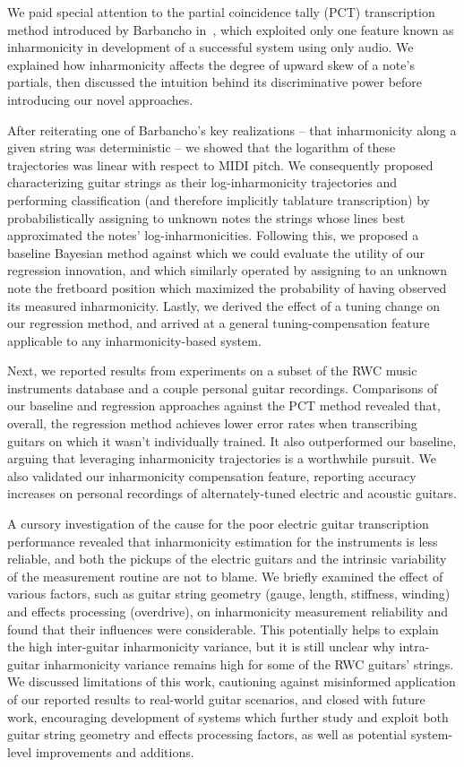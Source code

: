 \documentclass[12pt]{cmuthesis}
\begin{document}
We paid special attention to the partial coincidence tally (PCT) transcription method introduced by Barbancho in~\cite{barbanchoi2012}, which exploited only one feature known as inharmonicity in development of a successful system using only audio. We explained how inharmonicity affects the degree of upward skew of a note's partials, then discussed the intuition behind its discriminative power before introducing our novel approaches.

After reiterating one of Barbancho's key realizations -- that inharmonicity along a given string was deterministic -- we showed that the logarithm of these trajectories was linear with respect to MIDI pitch. We consequently proposed characterizing guitar strings as their log-inharmonicity trajectories and performing classification (and therefore implicitly tablature transcription) by probabilistically assigning to unknown notes the strings whose lines best approximated the notes' log-inharmonicities. Following this, we proposed a baseline Bayesian method against which we could evaluate the utility of our regression innovation, and which similarly operated by assigning to an unknown note the fretboard position which maximized the probability of having observed its measured inharmonicity. Lastly, we derived the effect of a tuning change on our regression method, and arrived at a general tuning-compensation feature applicable to any inharmonicity-based system.

Next, we reported results from experiments on a subset of the RWC music instruments database and a couple personal guitar recordings. Comparisons of our baseline and regression approaches against the PCT method revealed that, overall, the regression method achieves lower error rates when transcribing guitars on which it wasn't individually trained. It also outperformed our baseline, arguing that leveraging inharmonicity trajectories is a worthwhile pursuit. We also validated our inharmonicity compensation feature, reporting accuracy increases on personal recordings of alternately-tuned electric and acoustic guitars.

A cursory investigation of the cause for the poor electric guitar transcription performance revealed that inharmonicity estimation for the instruments is less reliable, and both the pickups of the electric guitars and the intrinsic variability of the measurement routine are not to blame. We briefly examined the effect of various factors, such as guitar string geometry (gauge, length, stiffness, winding) and effects processing (overdrive), on inharmonicity measurement reliability and found that their influences were considerable. This potentially helps to explain the high inter-guitar inharmonicity variance, but it is still unclear why intra-guitar inharmonicity variance remains high for some of the RWC guitars' strings. We discussed limitations of this work, cautioning against misinformed application of our reported results to real-world guitar scenarios, and closed with future work, encouraging development of systems which further study and exploit both guitar string geometry and effects processing factors, as well as potential system-level improvements and additions.
\end{document}
